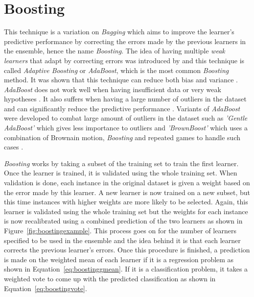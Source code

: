 
\section{Boosting}
This technique is a variation on \textit{Bagging} which aims to improve the learner's predictive performance by correcting the errors made by the previous learners in the ensemble, hence the name \textit{Boosting}. The idea of having multiple \textit{weak learners} that adapt by correcting errors was introduced by \citet{freund1997decision} and this technique is called \textit{Adaptive Boosting} or \textit{AdaBoost}, which is the most common \textit{Boosting} method. It was shown that this technique can reduce both bias and variance \citep{breiman1996bias}. \textit{AdaBoost} does not work well when having insufficient data or very weak hypotheses \citep{freund1999short}. It also suffers when having a large number of outliers in the dataset and can significantly reduce the predictive performance \citep{dietterich1998experimental}. Variants of \textit{AdaBoost} were developed to combat large amount of outliers in the dataset such as \textit{'Gentle AdaBoost'} which gives less importance to outliers \citep{friedman2000additive} and \textit{'BrownBoost'} which uses a combination of Brownain motion, \textit{Boosting} and repeated games to handle such cases \citep{freund2001adaptive}.  

\textit{Boosting} works by taking a subset of the training set to train the first learner. Once the learner is trained, it is validated using the whole training set. When validation is done, each instance in the original dataset is given a weight based on the error made by this learner. A new learner is now trained on a new subset, but this time instances with higher weights are more likely to be selected. Again, this learner is validated using the whole training set but the weights for each instance is now recalibrated using a combined prediction of the two learners as shown in Figure~\ref{fig:boostingexample}. This process goes on for the number of learners specified to be used in the ensemble and the idea behind it is that each learner corrects the previous learner's errors.  Once this procedure is finished, a prediction is made on the weighted mean of each learner if it is a regression problem as shown in Equation~\ref{eq:boostinggmean}. If it is a classification problem, it takes a weighted vote to come up with the predicted classification  as shown in Equation~\ref{eq:boostingvote}. 

